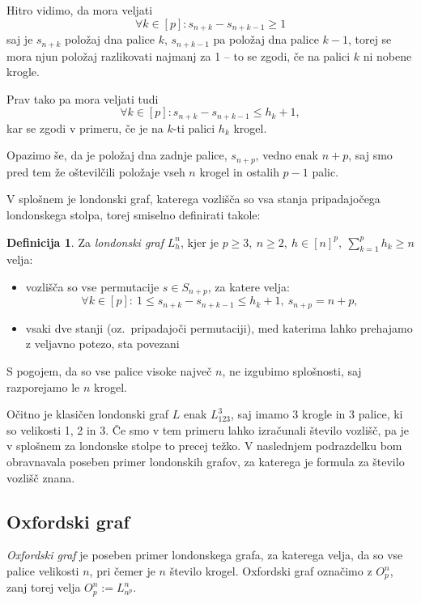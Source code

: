 \documentclass[12pt,a4paper]{amsart}
\theoremstyle{definition} %
\newtheorem{definicija}{Definicija}[section]
\theoremstyle{plain} %
\begin{document}
Hitro vidimo, da mora veljati 
\[\forall k \in [p]\colon s_{n+k} - s_{n+k-1} \geq 1 \]
saj je $s_{n+k}$ položaj dna palice $k$, $s_{n+k-1}$ pa položaj dna palice $k-1$, torej se mora njun položaj razlikovati najmanj za 1 -- to se zgodi, če na palici $k$ ni nobene krogle.

Prav tako pa mora veljati tudi 
\[\forall k \in [p]\colon s_{n+k} - s_{n+k-1} \leq h_k + 1,\]
kar se zgodi v primeru, če je na $k$-ti palici $h_k$ krogel.

Opazimo še, da je položaj dna zadnje palice, $s_{n+p}$, vedno enak $n+p$, saj smo pred tem že oštevilčili položaje vseh $n$ krogel in ostalih $p-1$ palic.

V splošnem je londonski graf, katerega vozlišča so vsa stanja pripadajočega londonskega stolpa, torej smiselno definirati takole:

\begin{definicija}
    Za \emph{londonski graf} $L_h^n$, kjer je $p \geq 3,\ n \geq 2,\ h \in [n]^p,\  \sum_{k=1}^p h_k \geq n$ velja:
    \begin{itemize}
        \item vozlišča so vse permutacije $s \in S_{n+p}$, za katere velja:
        \[\forall k \in [p]:\ 1 \leq s_{n+k} - s_{n+k-1} \leq h_k + 1,\ s_{n+p} = n + p ,\]
        \item vsaki dve stanji (oz.\ pripadajoči permutaciji), med katerima lahko prehajamo z veljavno potezo, sta povezani
    \end{itemize}
\end{definicija}

S pogojem, da so vse palice visoke največ $n$, ne izgubimo splošnosti, saj razporejamo le $n$ krogel.

Očitno je klasičen londonski graf $L$ enak $L_{123}^3$, saj imamo 3 krogle in 3 palice, ki so velikosti 1, 2 in 3.
Če smo v tem primeru lahko izračunali število vozlišč, pa je v splošnem za londonske stolpe to precej težko. V naslednjem podrazdelku bom obravnavala poseben primer londonskih grafov, za katerega je formula za število vozlišč znana. 

\subsection{Oxfordski graf}

\emph{Oxfordski graf} je poseben primer londonskega grafa, za katerega velja, da so vse palice velikosti $n$, pri čemer je $n$ število krogel. Oxfordski graf označimo z $O^n_p$, zanj torej velja $O^n_p := L^n_{n^p}$.
\end{document}
